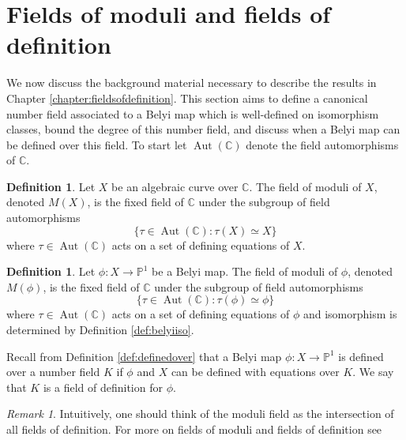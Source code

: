 \documentclass{dcthesis}
\newcommand{\PP}{\mathbb P}
\newcommand{\CC}{\mathbb C}
\newcommand{\defi}[1]{\textsf{#1}}
\DeclareMathOperator{\Aut}{Aut}
\numberwithin{equation}{section}
\theoremstyle{definition}
\newtheorem{definition}[equation]{Definition}
\theoremstyle{remark}
\newtheorem{remark}[equation]{Remark}
\begin{document}
{{  \section{Fields of moduli and fields of definition}{\label{sec:fieldsofmodulifieldsofdefinition}
    We now discuss the background
    material necessary to describe
    the results in
    Chapter \ref{chapter:fieldsofdefinition}.
    This section aims
    to define a canonical number field
    associated to a Belyi map
    which is well-defined on isomorphism classes,
    bound the degree of this number field,
    and discuss when a Belyi map can be defined
    over this field.
    To start let $\Aut(\CC)$ denote the
    field automorphisms of $\CC$.
    \begin{definition}
      \label{def:fieldofmoduli}
      Let $X$ be an algebraic curve over $\CC$.
      The \defi{field of moduli} of $X$,
      denoted $M(X)$,
      is the fixed field of $\CC$ under
      the subgroup of field automorphisms
      \begin{equation}
        \label{eqn:fixedfield}
        \{\tau\in\Aut(\CC) : \tau(X)\simeq X\}
      \end{equation}
      where $\tau\in\Aut(\CC)$ acts on
      a set of defining equations of $X$.
    \end{definition}
    \begin{definition}
      \label{def:fieldofmodulibelyimap}
      Let $\phi\colon X\to\PP^1$ be a Belyi map.
      The \defi{field of moduli} of $\phi$,
      denoted $M(\phi)$,
      is the fixed field of $\CC$ under
      the subgroup of
      field automorphisms
      \begin{equation}
        \label{eqn:fixedfieldphi}
        \{\tau\in\Aut(\CC) : \tau(\phi)\simeq\phi\}
      \end{equation}
      where $\tau\in\Aut(\CC)$ acts on
      a set of defining equations of $\phi$
      and isomorphism is determined by
      Definition \ref{def:belyiiso}.
    \end{definition}
    Recall from Definition \ref{def:definedover}
    that a Belyi map
    $\phi\colon X\to\PP^1$
    is defined over a number field $K$
    if $\phi$ and $X$ can be defined with
    equations over $K$.
    We say that $K$
    is a \defi{field of definition}
    for $\phi$.
    \begin{remark}
      Intuitively, one should think of the moduli
      field as the intersection of all fields of definition.
      For more on fields of moduli and fields of definition
      see

\end{remark}}}}
\end{document}
